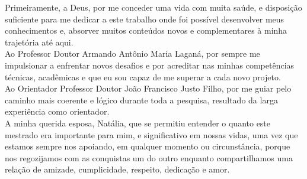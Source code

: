     Primeiramente, a Deus, por me conceder uma vida com muita saúde, e disposição suficiente para me dedicar a este trabalho onde foi possível desenvolver meus conhecimentos e, absorver muitos conteúdos novos e complementares à minha trajetória até aqui.\\

    Ao Professor Doutor Armando Antônio Maria Laganá, por sempre me impulsionar a enfrentar novos desafios e por acreditar nas minhas competências técnicas, acadêmicas e que eu sou capaz de me superar a cada novo projeto.\\
    
    Ao Orientador Professor Doutor João Francisco Justo Filho, por me guiar pelo caminho mais coerente e lógico durante toda a pesquisa, resultado da larga experiência como orientador.\\

    A minha querida esposa, Natália, que se permitiu entender o quanto este mestrado era importante para mim, e significativo em nossas vidas, uma vez que estamos sempre nos apoiando, em qualquer momento ou circunstância, porque nos regozijamos com as conquistas um do outro enquanto compartilhamos uma relação de amizade, cumplicidade, respeito, dedicação e amor.
    

